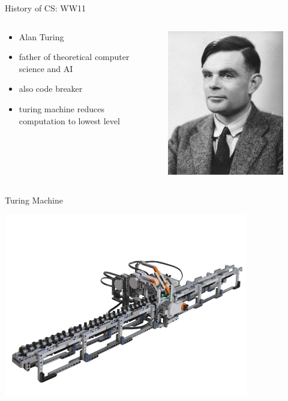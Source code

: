 \documentclass[xcolor={dvipsnames}]{beamer}
\begin{document}
\begin{frame}{History of CS: WW11}
	\begin{columns}
	 \begin{column}{.49\textwidth}
			\begin{itemize}
				\item Alan Turing
				\item father of theoretical computer science and AI
				\item also code breaker
				\item turing machine reduces computation to lowest level
			\end{itemize}
 	\end{column}
	 \begin{column}{.49\textwidth}
  		\begin{figure}
 		\includegraphics{Alan_Turing_photo}
		\end{figure}
	\end{column}
\end{columns}
\end{frame}

\begin{frame}{Turing Machine}
	\begin{center}
	\href{http://vimeo.com/44202270}{\includegraphics[width=0.8\textwidth]{lego_tm}}
	\end{center}
\end{frame}
\end{document}
